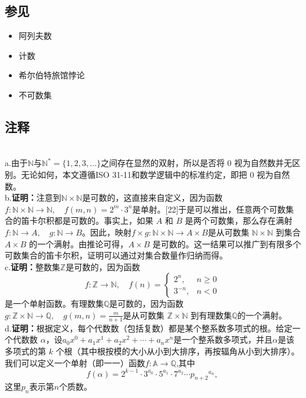{\subsection{参见}
\begin{itemize}
\item 阿列夫数
\item 计数
\item 希尔伯特旅馆悖论
\item 不可数集
\end{itemize}
\subsection{注释}\\
a.由于$\mathbb{N}$与$\mathbb{N}^{*}=\{1,2,3,\dots\}$之间存在显然的双射，所以是否将 0 视为自然数并无区别。无论如何，本文遵循ISO 31-11和数学逻辑中的标准约定，即把 0 视为自然数。\\
b.\textbf{证明：}注意到$\mathbb{N} \times \mathbb{N}$是可数的，这直接来自定义，因为函数$f : \mathbb{N} \times \mathbb{N} \to \mathbb{N}, \quad f(m,n) = 2^{m}\cdot 3^{n}$是单射。[22]于是可以推出，任意两个可数集合的笛卡尔积都是可数的。事实上，如果 $A$ 和 $B$ 是两个可数集，那么存在满射$
f : \mathbb{N} \to A, \quad g : \mathbb{N} \to B$。因此，映射$f \times g : \mathbb{N} \times \mathbb{N} \to A \times B$是从可数集 $\mathbb{N} \times \mathbb{N}$ 到集合 $A \times B$ 的一个满射。由推论可得，$A \times B$ 是可数的。这一结果可以推广到有限多个可数集合的笛卡尔积，证明可以通过对集合数量作归纳而得。\\
c.\textbf{证明：}整数集$\mathbb{Z}$是可数的，因为函数
$$
f : \mathbb{Z} \to \mathbb{N}, \quad 
f(n) = 
\begin{cases} 
2^{n}, & n \geq 0 \\[6pt] 
3^{-n}, & n < 0 
\end{cases}~
$$
是一个单射函数。有理数集$\mathbb{Q}$是可数的，因为函数$g : \mathbb{Z} \times \mathbb{N} \to \mathbb{Q}, \quad g(m,n) = \frac{m}{n+1}$是从可数集 $\mathbb{Z} \times \mathbb{N}$ 到有理数集$\mathbb{Q}$的一个满射。\\
d.\textbf{证明：}根据定义，每个代数数（包括复数）都是某个整系数多项式的根。给定一个代数数 $\alpha$，设$a_{0}x^{0} + a_{1}x^{1} + a_{2}x^{2} + \cdots + a_{n}x^{n}$是一个整系数多项式，并且$\alpha$是该多项式的第 $k$ 个根（其中根按模的大小从小到大排序，再按辐角从小到大排序）。我们可以定义一个单射（即一一）函数$f : \mathbb{A} \to \mathbb{Q}$,其中
$$
f(\alpha) = 2^{k-1} \cdot 3^{a_{0}} \cdot 5^{a_{1}} \cdot 7^{a_{2}} \cdots {p_{n+2}}^{a_{n}},~
$$
这里$p_{n}$表示第$n$个质数。\\
}
